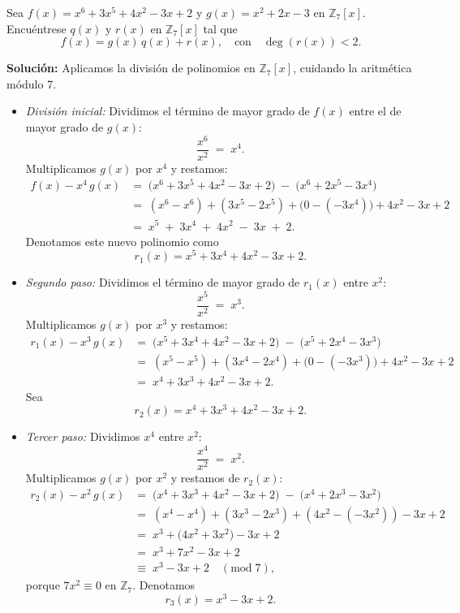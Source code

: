 Sea $f(x) = x^6 + 3x^5 + 4x^2 - 3x + 2$ y $g(x) = x^2 + 2x - 3$ en $\mathbb{Z}_7[x]$. 
Encuéntrese $q(x)$ y $r(x)$ en $\mathbb{Z}_7[x]$ tal que 
\[
f(x) = g(x)\,q(x) + r(x), 
\quad\text{con}\quad \deg(r(x)) < 2.
\]

\textbf{Solución:} Aplicamos la división de polinomios en $\mathbb{Z}_7[x]$, cuidando la aritmética módulo 7.

\begin{itemize}

    \item \textit{División inicial:} Dividimos el término de mayor grado de $f(x)$ entre el de mayor grado de $g(x)$:
    \[
    \frac{x^6}{x^2} \;=\; x^4.
    \]
    Multiplicamos $g(x)$ por $x^4$ y restamos:
    \[
    \begin{aligned}
    f(x) - x^4\,g(x)
    &=\; \bigl(x^6 + 3x^5 + 4x^2 - 3x + 2\bigr)
    \;-\; \bigl(x^6 + 2x^5 - 3x^4\bigr) \\
    &=\; (x^6 - x^6)
    + (3x^5 - 2x^5)
    + \bigl(0 - (-3x^4)\bigr)
    + 4x^2
    - 3x
    + 2 \\
    &=\; x^5 \;+\; 3x^4 \;+\; 4x^2 \;-\; 3x \;+\; 2.
    \end{aligned}
    \]
    Denotamos este nuevo polinomio como 
    \[
    r_1(x) = x^5 + 3x^4 + 4x^2 - 3x + 2.
    \]

    \item \textit{Segundo paso:} Dividimos el término de mayor grado de $r_1(x)$ entre $x^2$:
    \[
    \frac{x^5}{x^2} \;=\; x^3.
    \]
    Multiplicamos $g(x)$ por $x^3$ y restamos:
    \[
    \begin{aligned}
    r_1(x) - x^3\,g(x)
    &=\; \bigl(x^5 + 3x^4 + 4x^2 - 3x + 2\bigr)
    \;-\;\bigl(x^5 + 2x^4 - 3x^3\bigr) \\
    &=\; (x^5 - x^5)
    + (3x^4 - 2x^4)
    + \bigl(0 - (-3x^3)\bigr)
    + 4x^2
    - 3x
    + 2 \\
    &=\; x^4 + 3x^3 + 4x^2 - 3x + 2.
    \end{aligned}
    \]
    Sea 
    \[
    r_2(x) = x^4 + 3x^3 + 4x^2 - 3x + 2.
    \]

    \item \textit{Tercer paso:} Dividimos $x^4$ entre $x^2$:
    \[
    \frac{x^4}{x^2} \;=\; x^2.
    \]
    Multiplicamos $g(x)$ por $x^2$ y restamos de $r_2(x)$:
    \[
    \begin{aligned}
    r_2(x) - x^2\,g(x)
    &=\; \bigl(x^4 + 3x^3 + 4x^2 - 3x + 2\bigr)
    \;-\;\bigl(x^4 + 2x^3 - 3x^2\bigr) \\
    &=\; (x^4 - x^4)
    + (3x^3 - 2x^3)
    + (4x^2 - (-3x^2))
    - 3x
    + 2 \\
    &=\; x^3 + \bigl(4x^2 + 3x^2\bigr) - 3x + 2 \\
    &=\; x^3 + 7x^2 - 3x + 2 \\
    &\equiv\; x^3 - 3x + 2 
    \quad (\mathrm{mod}\;7),
    \end{aligned}
    \]
    porque $7x^2 \equiv 0$ en $\mathbb{Z}_7$. Denotamos 
    \[
    r_3(x) = x^3 - 3x + 2.
    \]


\end{itemize}
